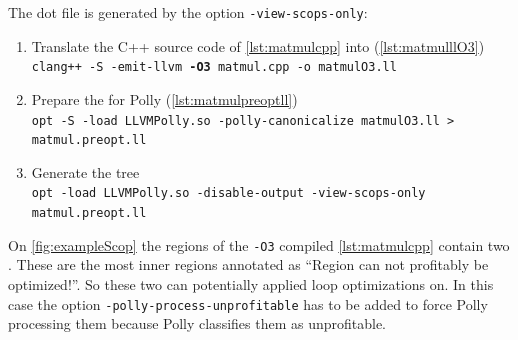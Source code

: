 The dot file is generated by the option \texttt{-view-scops-only}:
\begin{sloppypar}
    \begin{enumerate}
        \item Translate the C++ source code of \autoref{lst:matmulcpp} into \llvmir (\autoref{lst:matmulllO3})\\
            \texttt{clang++ -S -emit-llvm \textbf{-O3} matmul.cpp -o matmulO3.ll}
        \item Prepare the \llvmir for Polly (\autoref{lst:matmulpreoptll})\\
            \texttt{opt -S -load LLVMPolly.so -polly-canonicalize matmulO3.ll > matmul.preopt.ll}
        \item Generate the \scop tree\\
            \texttt{opt -load LLVMPolly.so -disable-output -view-scops-only matmul.preopt.ll}
    \end{enumerate}
    On \autoref{fig:exampleScop} the regions of the \texttt{-O3} compiled \autoref{lst:matmulcpp} contain two \scops.
    These are the most inner regions annotated as \enquote{Region can not profitably be optimized!}.
    So these two can potentially applied loop optimizations on.
    In this case the option \texttt{-polly-process-unprofitable} has to be added to force Polly processing them because Polly classifies them as unprofitable.
\end{sloppypar}

